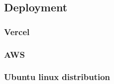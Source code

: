 \subsection{Deployment}\label{subsec:deployment}

\subsubsection{Vercel}

\subsubsection{AWS}

\subsubsection{Ubuntu linux distribution}
